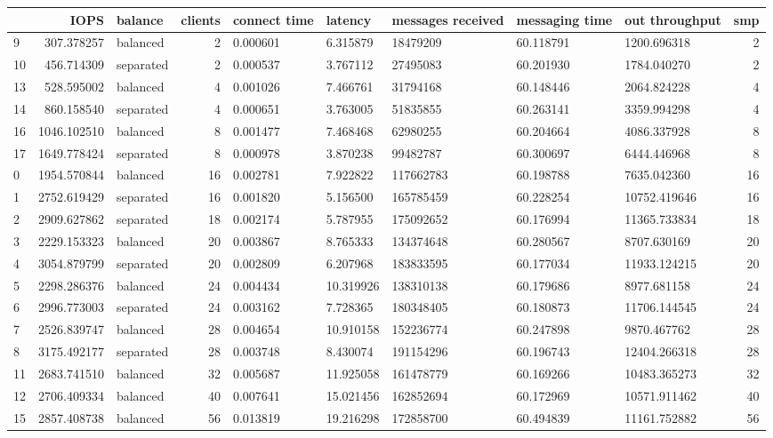\begin{tabular}{lrlrlllllr}
\toprule
 & IOPS & balance & clients & connect time & latency & messages received & messaging time & out throughput & smp \\
\midrule
9 & 307.378257 & balanced & 2 & 0.000601 & 6.315879 & 18479209 & 60.118791 & 1200.696318 & 2 \\
10 & 456.714309 & separated & 2 & 0.000537 & 3.767112 & 27495083 & 60.201930 & 1784.040270 & 2 \\
13 & 528.595002 & balanced & 4 & 0.001026 & 7.466761 & 31794168 & 60.148446 & 2064.824228 & 4 \\
14 & 860.158540 & separated & 4 & 0.000651 & 3.763005 & 51835855 & 60.263141 & 3359.994298 & 4 \\
16 & 1046.102510 & balanced & 8 & 0.001477 & 7.468468 & 62980255 & 60.204664 & 4086.337928 & 8 \\
17 & 1649.778424 & separated & 8 & 0.000978 & 3.870238 & 99482787 & 60.300697 & 6444.446968 & 8 \\
0 & 1954.570844 & balanced & 16 & 0.002781 & 7.922822 & 117662783 & 60.198788 & 7635.042360 & 16 \\
1 & 2752.619429 & separated & 16 & 0.001820 & 5.156500 & 165785459 & 60.228254 & 10752.419646 & 16 \\
2 & 2909.627862 & separated & 18 & 0.002174 & 5.787955 & 175092652 & 60.176994 & 11365.733834 & 18 \\
3 & 2229.153323 & balanced & 20 & 0.003867 & 8.765333 & 134374648 & 60.280567 & 8707.630169 & 20 \\
4 & 3054.879799 & separated & 20 & 0.002809 & 6.207968 & 183833595 & 60.177034 & 11933.124215 & 20 \\
5 & 2298.286376 & balanced & 24 & 0.004434 & 10.319926 & 138310138 & 60.179686 & 8977.681158 & 24 \\
6 & 2996.773003 & separated & 24 & 0.003162 & 7.728365 & 180348405 & 60.180873 & 11706.144545 & 24 \\
7 & 2526.839747 & balanced & 28 & 0.004654 & 10.910158 & 152236774 & 60.247898 & 9870.467762 & 28 \\
8 & 3175.492177 & separated & 28 & 0.003748 & 8.430074 & 191154296 & 60.196743 & 12404.266318 & 28 \\
11 & 2683.741510 & balanced & 32 & 0.005687 & 11.925058 & 161478779 & 60.169266 & 10483.365273 & 32 \\
12 & 2706.409334 & balanced & 40 & 0.007641 & 15.021456 & 162852694 & 60.172969 & 10571.911462 & 40 \\
15 & 2857.408738 & balanced & 56 & 0.013819 & 19.216298 & 172858700 & 60.494839 & 11161.752882 & 56 \\
\bottomrule
\end{tabular}


